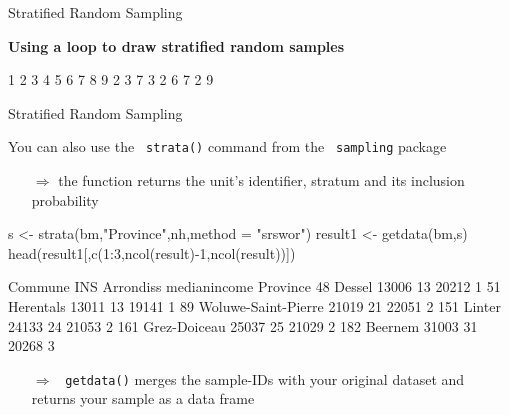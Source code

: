 \documentclass[11pt,german,hideothersubsections]{beamer}
\newcommand{\R}[1]{{\tt \color{blue}  #1}}
\begin{document}
\begin{frame}[fragile]{Stratified Random Sampling}
\footnotesize{
\begin{center}
\textbf{Using a loop to draw stratified random samples}
\end{center}
\begin{Schunk}
\begin{Soutput}
1 2 3 4 5 6 7 8 9 
2 3 7 3 2 6 7 2 9 
\end{Soutput}
\end{Schunk}
}
\end{frame}
\begin{frame}[fragile]{Stratified Random Sampling}
\footnotesize{
You can also use the \R{strata()} command from the \R{sampling} package
\begin{itemize}
\item[$\Rightarrow$] the function returns the unit's identifier, stratum and its inclusion probability
\end{itemize}
\begin{Schunk}
\begin{Sinput}
 s <- strata(bm,"Province",nh,method = "srswor")
 result1 <- getdata(bm,s)
 head(result1[,c(1:3,ncol(result)-1,ncol(result))])
\end{Sinput}
\begin{Soutput}
                Commune   INS Arrondiss medianincome Province
48               Dessel 13006        13        20212        1
51            Herentals 13011        13        19141        1
89  Woluwe-Saint-Pierre 21019        21        22051        2
151              Linter 24133        24        21053        2
161        Grez-Doiceau 25037        25        21029        2
182             Beernem 31003        31        20268        3
\end{Soutput}
\end{Schunk}
\begin{itemize}
\item[$\Rightarrow$] \R{getdata()} merges the sample-IDs with your original dataset and returns your sample as a data frame
\end{itemize}
}
\end{frame}
\end{document}
